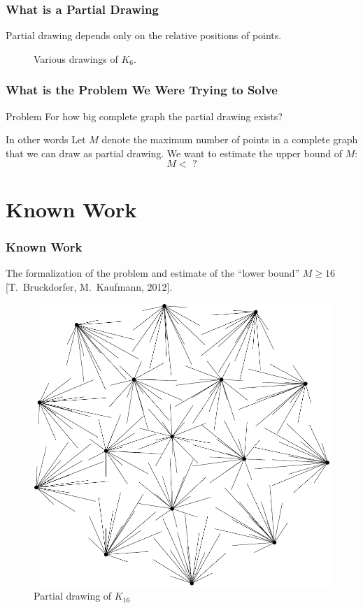 \documentclass{beamer}
\begin{document}
\setcounter{subfigure}{0} %

\begin{frame}
\frametitle{What is a Partial Drawing}
Partial drawing depends only on the relative positions of points.
\begin{figure}[H]
\centering

\caption{Various drawings of $K_{6}$.}
\end{figure}
\end{frame}

\begin{frame}
\frametitle{What is the Problem We Were Trying to Solve}

\begin{block}{Problem}
For how big complete graph the partial drawing exists?
\end{block}

\begin{block}{In other words}
Let $M$ denote the maximum number of points in a complete graph that we
can draw as partial drawing. We want to estimate the upper bound
of $M$:
$$M < \text{ ?}$$
\end{block}
\begin{figure}[H]
\centering

\end{figure}
\end{frame}

\section{Known Work}
\begin{frame}
\frametitle{Known Work}
The formalization of the problem and estimate of the ``lower bound'' $M \geq 16$ [T.\ Bruckdorfer, M.\ Kaufmann, 2012].

\begin{figure}[H]
\centering
\includegraphics[width=.3\textwidth]{./figures/partial-drawing-of-k_16.pdf}
\caption{Partial drawing of $K_{16}$}
\end{figure}
\begin{figure}[H]
\centering

\end{figure}
\end{frame}
\end{document}
